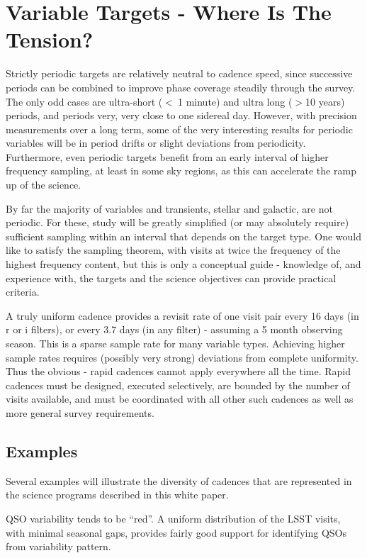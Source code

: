 \section{Variable Targets - Where Is The Tension?}

Strictly periodic targets are relatively neutral to cadence speed, since successive periods can be combined to improve phase coverage steadily through the survey.  The only odd cases are ultra-short ($<~ $1 minute) and ultra long ($> $10 years) periods, and periods very, very close to one sidereal day.  However, with precision measurements over a long term, some of the very interesting results for periodic variables will be in period drifts or slight deviations from periodicity. Furthermore, even periodic targets benefit from an early interval of higher frequency sampling, at least in some sky regions, as this can accelerate the ramp up of the science.

By far the majority of variables and transients, stellar and galactic, are not periodic. For these, study will be greatly simplified (or may absolutely require) sufficient sampling within an interval that depends on the target type. One would like to satisfy the sampling theorem, with visits at twice the frequency of the highest frequency content, but this is only a conceptual guide - knowledge of, and experience with, the targets and the science objectives can provide practical criteria.

A truly uniform cadence provides a revisit rate of one visit pair every 16 days (in r or i filters), or every 3.7 days (in any filter) - assuming a 5 month observing season.  This is a sparse sample rate for many variable types.  Achieving higher sample rates requires (possibly very strong) deviations from complete uniformity.  Thus the obvious -  rapid cadences cannot apply everywhere all the time. Rapid cadences must be designed, executed selectively, are bounded by the number of visits available, and must be coordinated with all other such cadences as well as more general survey requirements. 

\subsection{Examples}

Several examples will illustrate the diversity of cadences that are represented in the science programs described in this white paper.

QSO variability tends to be ``red''.   A uniform distribution of the LSST visits, with minimal seasonal gaps, provides fairly good support for identifying QSOs from variability pattern.
	
